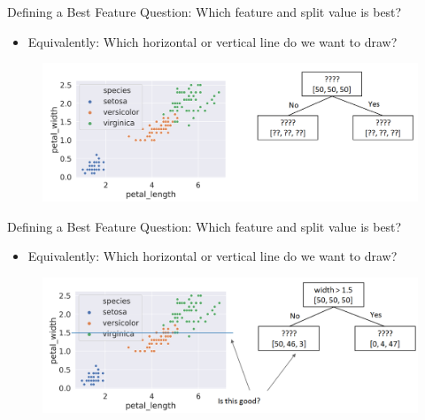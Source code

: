 \documentclass[aspectratio=169]{../latex_main/tntbeamer}  %
\begin{document}
	
	\begin{frame}{Defining a Best Feature}
	    Question: Which feature and split value is best?
	    \begin{itemize}
	        \item  Equivalently: Which horizontal or vertical line do we want to draw?
	    \end{itemize}
	    \begin{figure}
	        \centering
	        \includegraphics[scale=.4]{figure_tree/Bild41}
	    \end{figure}
	\end{frame}
	
	\begin{frame}{Defining a Best Feature}
	    Question: Which feature and split value is best?
	    \begin{itemize}
	        \item  Equivalently: Which horizontal or vertical line do we want to draw?
	    \end{itemize}
	    \begin{figure}
	        \centering
	        \includegraphics[scale=.4]{figure_tree/Bild42}
	    \end{figure}
	\end{frame}
	
\end{document}
